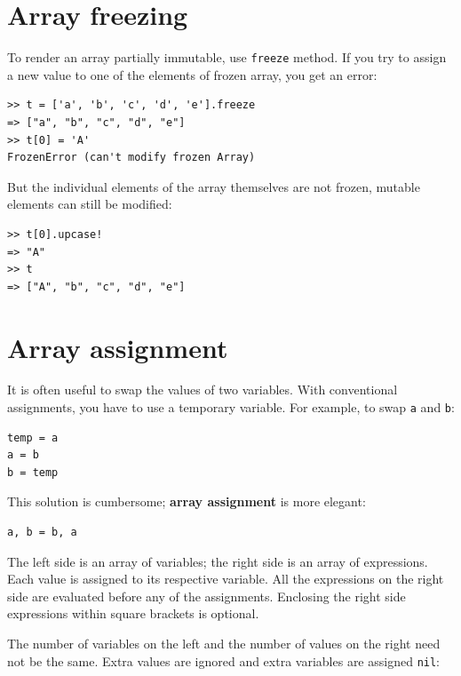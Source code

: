 \documentclass[10pt]{book}
\begin{document}
\section{Array freezing}

To render an array partially immutable, use {\tt freeze} method.
If you try to assign a new value to one of the elements of
frozen array, you get an error:

\begin{verbatim}
>> t = ['a', 'b', 'c', 'd', 'e'].freeze
=> ["a", "b", "c", "d", "e"]
>> t[0] = 'A'
FrozenError (can't modify frozen Array)
\end{verbatim}
%
But the individual elements of the array themselves are not frozen,
mutable elements can still be modified:

\begin{verbatim}
>> t[0].upcase!
=> "A"
>> t
=> ["A", "b", "c", "d", "e"]
\end{verbatim}

\section{Array assignment}
\label{array.assignment}

It is often useful to swap the values of two variables.
With conventional assignments, you have to use a temporary
variable.  For example, to swap {\tt a} and {\tt b}:

\begin{verbatim}
temp = a
a = b
b = temp
\end{verbatim}
%
This solution is cumbersome; {\bf array assignment} is more elegant:

\begin{verbatim}
a, b = b, a
\end{verbatim}
%
The left side is an array of variables; the right side is an array of
expressions.  Each value is assigned to its respective variable.  
All the expressions on the right side are evaluated before any
of the assignments.  Enclosing the right side expressions within
square brackets is optional.

The number of variables on the left and the number of
values on the right need not be the same. Extra values
are ignored and extra variables are assigned {\tt nil}:
\end{document}
